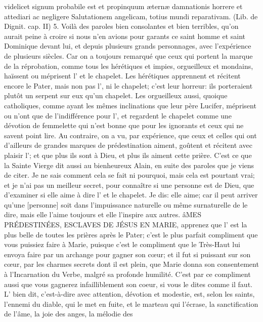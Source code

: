 videlicet signum probabile est et propinquum æternæ damnationis horrere et attediari ac negligere Salutationem
angelicam, totius mundi reparativam. (Lib. de Dignit. cap. II) 5. Voilà des paroles bien consolantes et bien terribles,
qu'on aurait peine à croire si nous n'en avions pour garants ce saint homme et saint Dominique devant lui, et
depuis plusieurs grands personnages, avec l'expérience de plusieurs siècles. Car on a toujours remarqué que
ceux qui portent la marque de la réprobation, comme tous les hérétiques et impies, orgueilleux et mondains,
haïssent ou méprisent l' et le chapelet. Les hérétiques apprennent et récitent encore le Pater, mais non
pas l', ni le chapelet; c'est leur horreur: ils porteraient plutôt un serpent sur eux qu'un chapelet. Les
orgueilleux aussi, quoique catholiques, comme ayant les mêmes inclinations que leur père Lucifer, méprisent ou
n'ont que de l'indifférence pour l', et regardent le chapelet comme une dévotion de femmelette qui n'est
bonne que pour les ignorants et ceux qui ne savent point lire. Au contraire, on a vu, par expérience, que ceux et
celles qui ont d'ailleurs de grandes marques de prédestination aiment, goûtent et récitent avec plaisir l';
et que plus ils sont à Dieu, et plus ils aiment cette prière. C'est ce que la Sainte Vierge dit aussi au bienheureux
Alain, en suite des paroles que je viens de citer.
 Je ne sais comment cela se fait ni pourquoi, mais cela est pourtant vrai; et je n'ai pas un meilleur secret, pour
connaître si une personne est de Dieu, que d'examiner si elle aime à dire l' et le chapelet. Je dis: elle
aime; car il peut arriver qu'une [personne] soit dans l'impuissance naturelle ou même surnaturelle de le dire, mais
elle l'aime toujours et elle l'inspire aux autres.
 âMES PRÉDESTINÉES, ESCLAVES DE JÉSUS EN MARIE, apprenez que l' est la plus belle de
toutes les prières après le Pater; c'est le plus parfait compliment que vous puissiez faire à Marie, puisque c'est le
compliment que le Très-Haut lui envoya faire par un archange pour gagner son cœur; et il fut si puissant sur son
cœur, par les charmes secrets dont il est plein, que Marie donna son consentement à l'Incarnation du Verbe,
malgré sa profonde humilité. C'est par ce compliment aussi que vous gagnerez infailliblement son coeur, si vous le
dites comme il faut.
 L' bien dit, c'est-à-dire avec attention, dévotion et modestie, est, selon les saints, l'ennemi du
diable, qui le met en fuite, et le marteau qui l'écrase, la sanctification de l'âme, la joie des anges, la mélodie des
